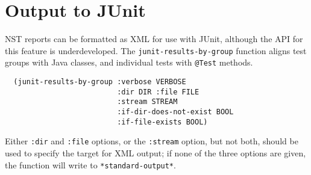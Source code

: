 
\section{Output to JUnit}

NST reports can be formatted as XML for use with JUnit, although the
API for this feature is underdeveloped.  The
\texttt{junit-results-by-group} function aligns test groups with Java
classes, and individual tests with \texttt{@Test} methods.
\begin{verbatim}
  (junit-results-by-group :verbose VERBOSE
                          :dir DIR :file FILE
                          :stream STREAM
                          :if-dir-does-not-exist BOOL
                          :if-file-exists BOOL)
\end{verbatim}
Either \texttt{:dir} and \texttt{:file} options, or the
\texttt{:stream} option, but not both, should be used to specify the
target for XML output; if none of the three options are given, the
function will write to \texttt{*standard-output*}.

